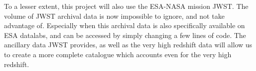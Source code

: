 \documentclass[11pt,usenatbib]{article}
\begin{document}
To a lesser extent, this project will also use the ESA-NASA mission JWST. The volume of JWST archival data is now impossible to ignore, and not take advantage of. Especially when this archival data is also specifically available on ESA datalabs, and can be accessed by simply changing a few lines of code. The ancillary data JWST provides, as well as the very high redshift data will allow us to create a more complete catalogue which accounts even for the very high redshift.


\end{document}
